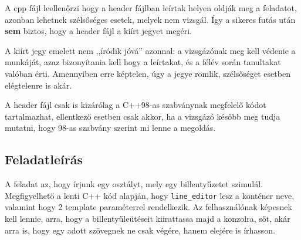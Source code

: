 \documentclass[../cpp_book/cpp_book.tex]{subfiles}
\begin{document}
	A cpp fájl leellenőrzi hogy a header fájlban leírtak helyen oldják meg a feladatot, azonban lehetnek szélsőséges esetek, melyek nem vizsgál. Így a sikeres futás után \textbf{sem} biztos, hogy a header fájl a kiírt jegyet megéri.
	
	A kiírt jegy emelett nem ,,íródik jóvá'' azonnal: a vizsgázónak meg kell védenie a munkáját, azaz bizonyítania kell hogy a leírtakat, és a félév során tanultakat valóban érti. Amennyiben erre képtelen, úgy a jegye romlik, szélsőséget esetben elégtelenre is akár.
	
	A header fájl csak is kizárólag a C++98-as szabványnak megfelelő kódot tartalmazhat, ellentkező esetben csak akkor, ha a vizsgázó később meg tudja mutatni, hogy 98-as szabvány szerint mi lenne a megoldás.
	\subsection{Feladatleírás}
	A feladat az, hogy írjunk egy osztályt, mely egy billentyűzetet szimulál. Megfigyelhető a lenti C++ kód alapján, hogy \texttt{line\_editor} lesz a konténer neve, valamint hogy 2 template paraméterrel rendelkezik. Az felhasználónak képesnek kell lennie, arra, hogy a billentyűleütéseit kiirattassa majd a konzolra, sőt, akár arra is, hogy egy adott szövegnek ne csak végére, hanem elejére is írhasson.
	\medskip
	
\end{document}
